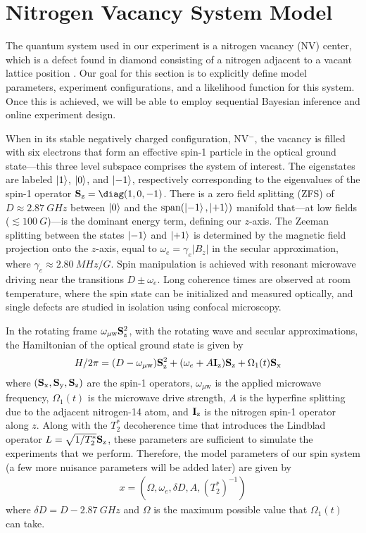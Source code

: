 \documentclass[aps,nofootinbib,twocolumn,superscriptaddress]{revtex4}
\newcommand{\mps}{x}
\renewcommand{\H}{H}    %
\renewcommand{\L}{L}    %
\newcommand{\uw}{{\mu\text{w}}}
\begin{document}
\section{Nitrogen Vacancy System Model}
\label{sec:system-model}

The quantum system used in our experiment is a nitrogen vacancy (NV) center,
which is a defect found in diamond consisting of a nitrogen adjacent to 
a vacant lattice position \cite{doherty_nitrogen-vacancy_2013}.
Our goal for this section is to explicitly define model parameters, experiment configurations, and a likelihood function for this system.
Once this is achieved, we will be able to employ sequential 
Bayesian inference and online experiment design.

When in its stable negatively charged configuration, NV$^-$, 
the vacancy is filled with
six electrons that form an effective spin-1 particle in the optical
ground state---this three level subspace comprises the system of interest.
The eigenstates are labeled $\ket{1}$, $\ket{0}$, and $\ket{-1}$, respectively 
corresponding to the eigenvalues of the spin-1 operator $\Sz=\diag(1,0,-1)$.
There is a zero field splitting (ZFS) of $D\approx\SI{2.87}{GHz}$ 
between $\ket{0}$ and the $\operatorname{span}(\ket{-1},\ket{+1})$ manifold 
that---at low fields ($\lesssim\SI{100}{G}$)---is the dominant energy term,
defining our $z$-axis.
The Zeeman splitting between the states $\ket{-1}$ and $\ket{+1}$ 
is determined by the magnetic field projection onto the $z$-axis, equal to
$\omega_e=\gamma_e |B_z|$ in the secular approximation, 
where $\gamma_e\approx\SI{2.80}{MHz/G}$.
Spin manipulation is achieved with resonant microwave driving near
the transitions $D\pm\omega_e$.
Long coherence times are observed at room temperature, where
the spin state can be initialized and measured optically, and single 
defects are studied in isolation using confocal microscopy.

In the rotating frame $\omega_\uw \Sz^2$, 
with the rotating wave and secular approximations,
the Hamiltonian of the optical ground state is given by
\begin{align}
    \H/2\pi &= (D-\omega_\uw)\Sz^2 + (\omega_e+A \Iz)\Sz + \Omega_1(t)\Sx
\end{align}
where $(\mathbf{S}_{\text{x}},\mathbf{S}_{\text{y}},\mathbf{S}_{\text{z}})$ are the spin-1 operators, $\omega_\uw$ is the applied
microwave frequency, $\Omega_1(t)$ is the microwave drive strength, $A$ is
the hyperfine splitting  due to the adjacent nitrogen-14 atom, and $\mathbf{I}_{\text{z}}$
is the nitrogen spin-1 operator along $z$.
Along with the $T_2^*$ decoherence time that introduces the 
Lindblad operator $\L=\sqrt{1/T_2^*}\Sz$, these parameters are sufficient
to simulate the experiments that we perform.
Therefore, the model parameters of our spin system (a few
more nuisance parameters will be added later) are given by
\begin{align}
    \mps=(\Omega,\omega_e,\delta D,A,(T_2^*)^{-1})
\end{align}
where $\delta D=D-\SI{2.87}{GHz}$ and $\Omega$ is the maximum possible
value that $\Omega_1(t)$ can take.
\end{document}
